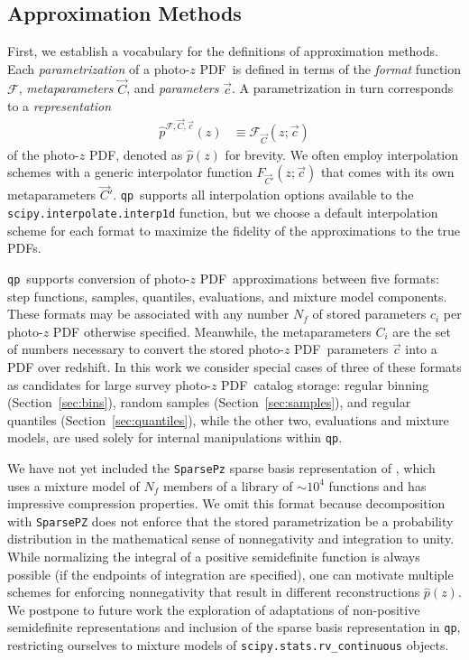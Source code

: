 \documentclass[\docopts]{\docclass}
\newcommand{\qp}{\texttt{qp}\xspace}
\newcommand{\pz}{photo-$z$ PDF\xspace}
\begin{document}
\subsection{Approximation Methods}
\label{sec:approx}

First, we establish a vocabulary for the definitions of approximation methods.
Each \textit{parametrization} of a \pz\ is defined in terms of the 
\textit{format} function $\mathcal{F}$, \textit{metaparameters} $\vec{C}$, and 
\textit{parameters} $\vec{c}$.
A parametrization in turn corresponds to a \textit{representation}
\begin{align}
  \label{eq:definition}
  \hat{p}^{\mathcal{F}, \vec{C}, \vec{c}}(z) &\equiv \mathcal{F}_{\vec{C}}(z; 
\vec{c})
\end{align}
of the \pz, denoted as $\hat{p}(z)$ for brevity.
We often employ interpolation schemes with a generic interpolator function 
$F_{\vec{C}'}(z; \vec{c})$ that comes with its own metaparameters $\vec{C}'$.
\qp\ supports all interpolation options available to the 
\texttt{scipy.interpolate.interp1d} function, but we choose a default 
interpolation scheme for each format to maximize the fidelity of the 
approximations to the true PDFs.

\qp\ supports conversion of \pz\ approximations between five formats: step 
functions, samples, quantiles, evaluations, and mixture model components.
These formats may be associated with any number $N_{f}$ of stored parameters 
$c_{i}$ per \pz%
otherwise specified.
Meanwhile, the metaparameters $C_{i}$ are the set of numbers necessary to 
convert the stored \pz\ parameters $\vec{c}$ into a PDF over redshift.
In this work we consider special cases of three of these formats as candidates 
for large survey \pz\ catalog storage: regular binning 
(Section~\ref{sec:bins}), random samples (Section~\ref{sec:samples}), and 
regular quantiles (Section~\ref{sec:quantiles}), while the other two, 
evaluations and mixture models, are used solely for internal manipulations 
within \qp.

We have not yet included the \texttt{SparsePz} sparse basis representation of 
\citet{carrasco_kind_sparse_2014}, which uses a mixture model of $N_{f}$ 
members of a library of $\sim10^{4}$ functions and has impressive compression 
properties.
We omit this format because decomposition with \texttt{SparsePZ} does not 
enforce that the stored parametrization be a probability distribution in the 
mathematical sense of nonnegativity and integration to unity.
While normalizing the integral of a positive semidefinite function is always 
possible (if the endpoints of integration are specified), one can motivate 
multiple schemes for enforcing nonnegativity that result in different 
reconstructions $\hat{p}(z)$.
We postpone to future work the exploration of adaptations of non-positive 
semidefinite representations and inclusion of the sparse basis representation 
in \qp, restricting ourselves to mixture models of 
\texttt{scipy.stats.rv_continuous} objects.
\end{document}
